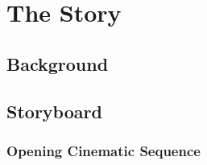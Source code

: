 \chapter{The Story}

\section{Background}

\section{Storyboard}
\subsection{Opening Cinematic Sequence}


